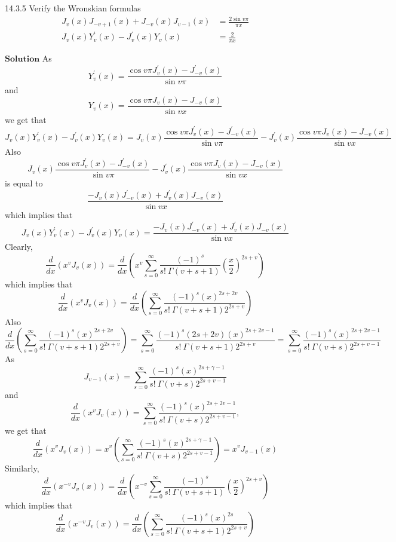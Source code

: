 \begin{mybox}{14.3.5}
Verify the Wronskian formulas
$$
\begin{aligned}
J_{v}(x) J_{-v+1}(x)+J_{-v}(x) J_{v-1}(x) &=\frac{2 \sin v \pi}{\pi x} \\
J_{v}(x) Y_{v}^{\prime}(x)-J_{v}^{\prime}(x) Y_{v}(x) &=\frac{2}{\pi x}
\end{aligned}
$$
\end{mybox}
$\boxed{\textbf{Solution}}$ As 
$$Y_{v}^{\prime}(x)=\frac{\cos v \pi J_{v}^{\prime}(x)-J_{-v}^{\prime}(x)}{\sin v \pi}$$ 
and 
$$Y_{v}(x)=\frac{\cos v \pi J_{v}(x)-J_{-v}(x)}{\sin v x}$$ 
we get that
$$J_{v}(x) Y_{v}^{\prime}(x)-J_{v}^{\prime}(x) Y_{v}(x)=J_{v}(x) \frac{\cos v \pi J_{v}^{\prime}(x)-J_{-v}^{\prime}(x)}{\sin v \pi}-J_{v}^{\prime}(x) \frac{\cos v \pi J_{v}(x)-J_{-v}(x)}{\sin v x}$$
Also 
$$J_{v}(x) \frac{\cos v \pi J_{v}^{\prime}(x)-J_{-v}^{\prime}(x)}{\sin v \pi}-J_{v}^{\prime}(x) \frac{\cos v \pi J_{v}(x)-J_{-v}(x)}{\sin v x}$$
is equal to
$$\frac{-J_{v}(x) J_{-v}^{\prime}(x)+J_{v}^{\prime}(x) J_{-v}(x)}{\sin v x}$$ 
which implies that
$$J_{v}(x) Y_{v}^{\prime}(x)-J_{v}^{\prime}(x) Y_{v}(x)=\frac{-J_{v}(x) J_{-v}^{\prime}(x)+J_{v}^{\prime}(x) J_{-v}(x)}{\sin v x}$$
Clearly, 
$$\frac{d}{d x}\left(x^{v} J_{v}(x)\right)=\frac{d}{d x}\left(x^{v} \sum_{s=0}^{\infty} \frac{(-1)^{s}}{s ! \  \Gamma(v+s+1)}\left(\frac{x}{2}\right)^{2 s+v}\right)$$ 
which implies that
$$\frac{d}{d x}\left(x^{v} J_{v}(x)\right)=\frac{d}{d x}\left(\sum_{s=0}^{\infty} \frac{(-1)^{s}(x)^{2 s+2 v}}{s ! \  \Gamma(v+s+1) 2^{2 s+v}}\right)$$
Also 
$$\frac{d}{d x}\left(\sum_{s=0}^{\infty} \frac{(-1)^{s}(x)^{2 s+2 v}}{s ! \  \Gamma(v+s+1) 2^{2 s+v}}\right)=\sum_{s=0}^{\infty} \frac{(-1)^{s}(2 s+2 v)(x)^{2 s+2 v-1}}{s ! \  \Gamma(v+s+1) 2^{2 s+v}}=\sum_{s=0}^{\infty} \frac{(-1)^{s}(x)^{2 s+2 v-1}}{s ! \  \Gamma(v+s) 2^{2 s+v-1}}$$
As 
$$J_{v-1}(x)=\sum_{s=0}^{\infty} \frac{(-1)^{s}(x)^{2 s+\gamma-1}}{s ! \  \Gamma(v+s) 2^{2 s+v-1}}$$
and 
$$\frac{d}{d x}\left(x^{v} J_{v}(x)\right)=\sum_{s=0}^{\infty} \frac{(-1)^{s}(x)^{2 s+2 v-1}}{s ! \  \Gamma(v+s) 2^{2 s+v-1}},$$ 
we get that
$$\frac{d}{d x}\left(x^{v} J_{v}(x)\right)=x^{v}\left(\sum_{s=0}^{\infty} \frac{(-1)^{s}(x)^{2 s+\gamma-1}}{s ! \  \Gamma(v+s) 2^{2 s+v-1}}\right)=x^{v} J_{v-1}(x)$$
Similarly, 
$$\frac{d}{d x}\left(x^{-v} J_{v}(x)\right)=\frac{d}{d x}\left(x^{-v} \sum_{s=0}^{\infty} \frac{(-1)^{s}}{s ! \  \Gamma(v+s+1)}\left(\frac{x}{2}\right)^{2 s+v}\right)$$ 
which implies that
$$\frac{d}{d x}\left(x^{-v} J_{v}(x)\right)=\frac{d}{d x}\left(\sum_{s=0}^{\infty} \frac{(-1)^{s}(x)^{2 s}}{s ! \  \Gamma(v+s+1) 2^{2 s+v}}\right)$$
